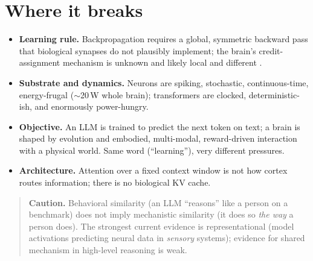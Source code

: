 \documentclass[11pt]{article}
\begin{document}
\section{Where it breaks}
\begin{itemize}[leftmargin=1.4em]
\item \textbf{Learning rule.} Backpropagation requires a global, symmetric backward pass that biological
synapses do not plausibly implement; the brain's credit-assignment mechanism is unknown and likely
local and different \citep{lillicrap2020backprop}.
\item \textbf{Substrate and dynamics.} Neurons are spiking, stochastic, continuous-time, energy-frugal
($\sim$20\,W whole brain); transformers are clocked, deterministic-ish, and enormously power-hungry.
\item \textbf{Objective.} An LLM is trained to predict the next token on text; a brain is shaped by
evolution and embodied, multi-modal, reward-driven interaction with a physical world. Same word
(``learning''), very different pressures.
\item \textbf{Architecture.} Attention over a fixed context window is not how cortex routes information;
there is no biological KV cache.
\end{itemize}

\begin{quote}\small
\textbf{Caution.} Behavioral similarity (an LLM ``reasons'' like a person on a benchmark) does not imply
mechanistic similarity (it does so \emph{the way} a person does). The strongest current evidence is
representational (model activations predicting neural data in \emph{sensory} systems); evidence for
shared mechanism in high-level reasoning is weak.
\end{quote}
\end{document}
